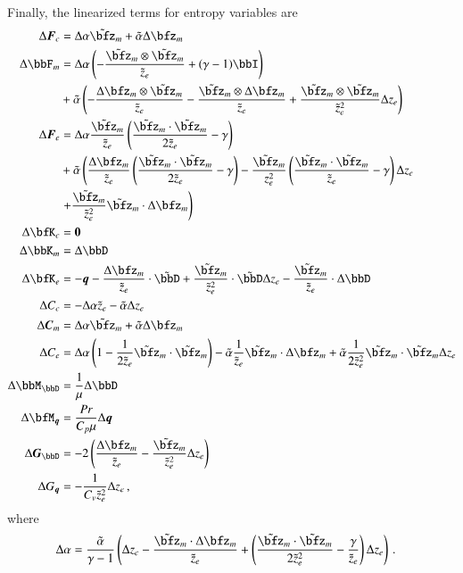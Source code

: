 \documentclass[preprint,12pt]{elsarticle}
\begin{document}
Finally, the linearized terms for entropy variables are
\begin{align*}
\Delta\bfF_c&=\Delta\alpha\tilde\bfz_m+\tilde\alpha\Delta\bfz_m\\
\Delta\bbF_m&=
\Delta\alpha\LRp{-\frac{\tilde\bfz_m\otimes\tilde\bfz_m}{\tilde z_e}+(\gamma-1)\bbI}\\
&+\tilde\alpha\LRp{
-\frac{\Delta\bfz_m\otimes\tilde\bfz_m}{\tilde z_e}
-\frac{\tilde\bfz_m\otimes\Delta\bfz_m}{\tilde z_e}
+\frac{\tilde\bfz_m\otimes\tilde\bfz_m}{\tilde z_e^2}\Delta z_e
}\\
\Delta\bfF_e&=
\Delta\alpha\frac{\tilde\bfz_m}{\tilde z_e}\LRp{\frac{\tilde\bfz_m\cdot\tilde\bfz_m}{2\tilde z_e}-\gamma}\\
&+\tilde\alpha\LRp{
\frac{\Delta\bfz_m}{\tilde z_e}\LRp{\frac{\tilde\bfz_m\cdot\tilde\bfz_m}{2\tilde z_e}-\gamma}
-\frac{\tilde\bfz_m}{z_e^2}\LRp{\frac{\tilde\bfz_m\cdot\tilde\bfz_m}{\tilde z_e}-\gamma}\Delta z_e\right.\\
&\left.
+\frac{\tilde\bfz_m}{\tilde z_e^2}
\tilde\bfz_m\cdot\Delta\bfz_m
}\\
\Delta\bfK_c&=\bs0\\
\Delta\bbK_m&=\Delta\bbD\\
\Delta\bfK_e&=-\bfq-\frac{\Delta\bfz_m}{\tilde z_e}\cdot\tilde\bbD
+\frac{\tilde\bfz_m}{\tilde z_e^2}\cdot\tilde\bbD\Delta z_e
-\frac{\tilde\bfz_m}{\tilde z_e}\cdot\Delta\bbD\\
\Delta C_c&=-\Delta\alpha\tilde z_e-\tilde\alpha\Delta z_e\\
\Delta\bfC_m&=\Delta\alpha\tilde\bfz_m+\tilde\alpha\Delta\bfz_m\\
\Delta C_e&=\Delta\alpha\LRp{1-\frac{1}{2\tilde z_e}\tilde\bfz_m\cdot\tilde\bfz_m}
	-\tilde\alpha\frac{1}{\tilde z_e}\tilde\bfz_m\cdot\Delta\bfz_m
	+\tilde\alpha\frac{1}{2\tilde z_e^2}\tilde\bfz_m\cdot\tilde\bfz_m\Delta z_e\\
\Delta\bbM_\bbD&=\frac{1}{\mu}\Delta \bbD\\
\Delta\bfM_{\bfq}&=\frac{Pr}{C_p\mu}\Delta\bfq\\
\Delta\bfG_{\bbD}&=-2\LRp{\frac{\Delta\bfz_m}{\tilde z_e}-\frac{\tilde\bfz_m}{\tilde z_e^2}\Delta z_e}\\
\Delta G_{\bfq}&=-\frac{1}{C_v\tilde z_e^2}\Delta z_e\,,
\end{align*}
where
\begin{align*}
\Delta\alpha&=
\frac{\tilde\alpha}{\gamma-1}\LRp{\Delta z_c-\frac{\tilde\bfz_m\cdot\Delta\bfz_m}{\tilde z_e}
+\LRp{\frac{\tilde\bfz_m\cdot\tilde\bfz_m}{2\tilde z_e^2}-\frac{\gamma}{\tilde z_e}}\Delta z_e}\,.
\end{align*}
\end{document}
